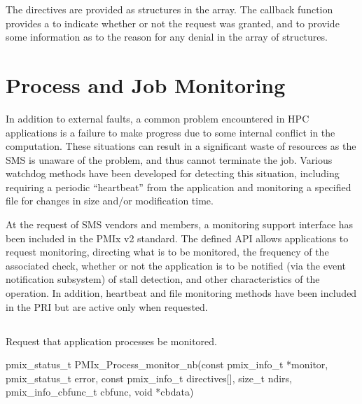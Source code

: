 The directives are provided as  structures in the  array.
The callback function provides a  to indicate whether or not the request was granted, and to provide some information as to the reason for any denial in the  array of  structures.


\section{Process and Job Monitoring}
\label{chap:api_job_mgmt:monitor}

In addition to external faults, a common problem encountered in \ac{HPC} applications is a failure to make
progress due to some internal conflict in the computation. These situations can
result in a significant waste of resources as the \ac{SMS} is unaware of the problem, and thus cannot terminate the
job. Various watchdog methods have been developed for detecting this situation, including requiring a periodic ``heartbeat''
from the application and monitoring a specified file for changes in size and/or modification time.

At the request of \ac{SMS} vendors and members, a monitoring support interface has been included in the PMIx v2 standard. The defined \ac{API} allows applications to request monitoring, directing what is to be monitored, the frequency of the associated check, whether or not the application is to be notified (via the event notification subsystem) of stall detection, and other characteristics of the operation. In addition, heartbeat and file monitoring methods have been included in the \ac{PRI} but are active only when requested.

\subsection{}

\summary

Request that application processes be monitored.

\format

\cspecificstart
\begin{codepar}
pmix_status_t
PMIx_Process_monitor_nb(const pmix_info_t *monitor, pmix_status_t error,
                        const pmix_info_t directives[], size_t ndirs,
                        pmix_info_cbfunc_t cbfunc, void *cbdata)
\end{codepar}
\cspecificend

